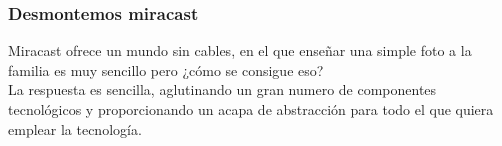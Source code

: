 \begin{frame}
  \frametitle{Desmontemos miracast}
  Miracast ofrece un mundo sin cables, en el que enseñar una simple foto a la familia es muy sencillo pero
  ¿cómo se consigue eso?\\

  La respuesta es sencilla, aglutinando un gran numero de componentes tecnológicos y proporcionando un acapa de
  abstracción para todo el que quiera emplear la tecnología.
\end{frame}

